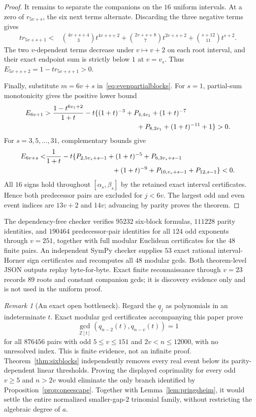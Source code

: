 \documentclass[11pt]{article}
\theoremstyle{remark}
\newtheorem{remark}[theorem]{Remark}
\newcommand{\Z}{\mathbb Z}
\numberwithin{equation}{section}
\begin{document}
\begin{proof}
It remains to separate the companions on the $16$ uniform intervals.  At a
zero of $r_{5v+s}$, the six next terms alternate.  Discarding the three
negative terms gives
\begin{align*}
 t r_{5v+s+1}<&{4v+s+4\choose3}t^{4v+s+2}
 +{2v+s+8\choose7}t^{2v+s+2}
 +{s+12\choose11}t^{s+2}.
\end{align*}
The two $v$-dependent terms decrease under $v\mapsto v+2$ on each root
interval, and their exact endpoint sum is strictly below $1$ at $v=v_s$.
Thus $E_{5v+s+2}=1-tr_{5v+s+1}>0$.

Finally, substitute $m=6v+s$ in~\eqref{eq:evenpartialblocks}.  For $s=1$,
partial-sum monotonicity gives the positive lower bound
\begin{align*}
 E_{6v+1}>{}&\frac{1-t^{6v_1+2}}{1+t}
 -t\{(1+t)^{-3}+P_{4,4v_1}+(1+t)^{-7}\\
 &\hspace{43mm}+P_{8,2v_1}+(1+t)^{-11}+1\}>0.
\end{align*}
For $s=3,5,\ldots,31$, complementary bounds give
\begin{align*}
 E_{6v+s}<&\frac1{1+t}-t\{P_{2,5v_s+s-1}+(1+t)^{-5}
 +P_{6,3v_s+s-1}\\
 &\hspace{34mm}+(1+t)^{-9}+P_{10,v_s+s-1}+P_{12,s-1}\}<0.
\end{align*}
All $16$ signs hold throughout $[\alpha_s,\beta_s]$ by the retained exact
interval certificates.  Hence both predecessor pairs are excluded for
$j<6v$.  The largest odd and even event indices are $13v+2$ and $14v$;
advancing by parity proves the theorem.
\end{proof}

The dependency-free checker verifies $95232$ six-block formulas, $111228$
parity identities, and $190464$ predecessor-pair identities for all $124$ odd
exponents through $v=251$, together with full modular Euclidean certificates
for the $48$ finite pairs.  An independent SymPy checker supplies $53$ exact
rational interval-Horner sign certificates and recomputes all $48$ modular
gcds.  Both theorem-level JSON outputs replay byte-for-byte.  Exact finite
reconnaissance through $v=23$ records $89$ roots and constant companion gcds;
it is discovery evidence only and is not used in the uniform proof.

\begin{remark}[An exact open bottleneck]\label{rem:coprimebottleneck}
Regard the $q_j$ as polynomials in an indeterminate $t$.  Exact modular gcd
certificates accompanying this paper prove
\[
 \gcd_{\Z[t]}(q_{n-2}(t),q_{n-v}(t))=1
\]
for all $876456$ pairs with odd $5\le v\le151$ and $2v<n\le12000$, with no
unresolved index.  This is finite evidence, not an infinite
proof.  Theorem~\ref{thm:sixblocks} independently removes every real event
below its parity-dependent linear thresholds.  Proving the displayed
coprimality for every odd $v\ge5$ and $n>2v$
would eliminate the only branch identified by
Proposition~\ref{prop:oneescape}.  Together with
Lemma~\ref{lem:pringsheim}, it would settle the entire normalized
smaller-gap-$2$ trinomial family, without restricting the algebraic degree of
$a$.
\end{remark}
\end{document}
